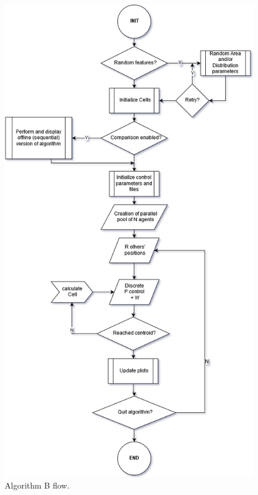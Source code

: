 \documentclass[a4paper,11pt,oneside]{book}
\begin{document}
	
	\begin{figure}[H]
		
		\centering
		
		\includegraphics[scale=0.55]{figs/algorithmB.png}
		
		\caption{Algorithm B flow.}\label{fig:algorithmB.png}
		
	\end{figure}
	
\end{document}
